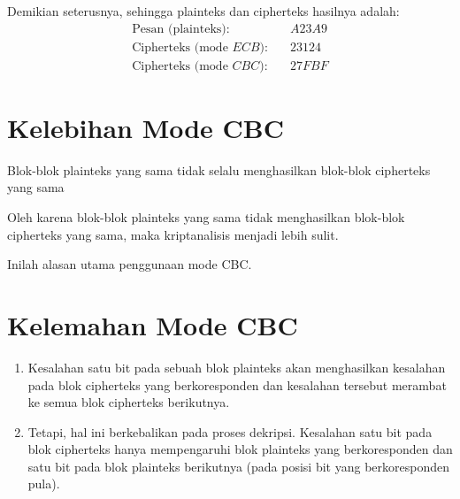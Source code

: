 \documentclass{article}
\begin{document}
\newpage


Demikian seterusnya, sehingga plainteks dan cipherteks hasilnya adalah:
\begin{align*}
\text{Pesan (plainteks):} & \quad A23A9 \\
\text{Cipherteks (mode $ECB$):} & \quad 23124 \\
\text{Cipherteks (mode $CBC$):} & \quad 27FBF
\end{align*}

\newpage


\section*{Kelebihan Mode CBC}

Blok-blok plainteks yang sama tidak selalu menghasilkan blok-blok cipherteks yang sama

Oleh karena blok-blok plainteks yang sama tidak menghasilkan blok-blok cipherteks yang sama, maka kriptanalisis menjadi lebih sulit.

Inilah alasan utama penggunaan mode CBC.

\newpage


\vspace{106.92mm}

\section*{Kelemahan Mode CBC}

\vspace{106.92mm}

\begin{enumerate}
    \item Kesalahan satu bit pada sebuah blok plainteks akan menghasilkan kesalahan pada blok cipherteks yang berkoresponden dan kesalahan tersebut merambat ke semua blok cipherteks berikutnya.
    \vspace{50mm}
    \item Tetapi, hal ini berkebalikan pada proses dekripsi. Kesalahan satu bit pada blok cipherteks hanya mempengaruhi blok plainteks yang berkoresponden dan satu bit pada blok plainteks berikutnya (pada posisi bit yang berkoresponden pula).
\end{enumerate}
\end{document}

